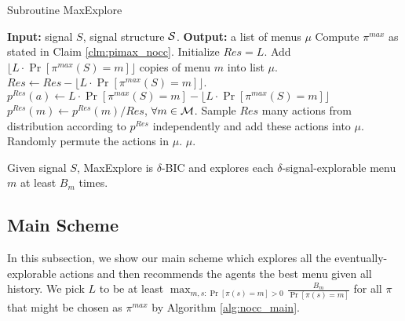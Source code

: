  \begin{algorithm}[H]
    \caption{Subroutine MaxExplore}
    	\label{alg:nocc_explore}
    \begin{algorithmic}[1]
	\STATE \textbf{Input:} signal $S$, signal structure $\S$.
	\STATE \textbf{Output:} a list of menus $\mu$
	\STATE Compute $\pi^{max}$ as stated in Claim \ref{clm:pimax_nocc}.
		\STATE Initialize $Res = L$.
                     		\STATE Add $\lfloor L \cdot \Pr[\pi^{max}(S) = m]\rfloor$ copies of menu $m$ into list $\mu$.
			\STATE $Res \leftarrow Res -\lfloor L \cdot \Pr[\pi^{max}(S) = m] \rfloor $.
			\STATE $p^{Res}(a)\leftarrow  L \cdot \Pr[\pi^{max}(S) = m] -  \lfloor L \cdot \Pr[\pi^{max}(S) = m]\rfloor$
		\ENDFOR 
		\STATE $p^{Res}(m) \leftarrow p^{Res}(m) / Res$, $\forall m \in \M$. 
		\STATE Sample $Res$ many actions from distribution according to $p^{Res}$ independently and add these actions into $\mu$. 
		\STATE Randomly permute the actions in $\mu$.
	\RETURN $\mu$.	 
     \end{algorithmic}
\end{algorithm}

\begin{claim}
\label{clm:maxexplore_nocc}
Given signal $S$, MaxExplore is $\delta$-BIC and explores each $\delta$-signal-explorable menu $m$ at least $B_m$ times.  
\end{claim}


\subsection{Main Scheme}
\label{sec:private_main}
In this subsection, we show our main scheme which explores all the eventually-explorable actions and then recommends the agents the best menu given all history. We pick $L$ to be at least $\max_{m,s:\Pr[\pi(s)=m] >0} \frac{B_m}{ \Pr[\pi(s)=m]}$ for all $\pi$ that might be chosen as $\pi^{max}$ by Algorithm \ref{alg:nocc_main}.

